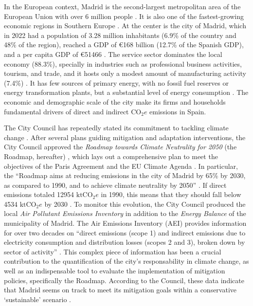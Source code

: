 \documentclass[
  10pt,
  twocolumn]{aft}
\begin{document}
In the European context, Madrid is the second-largest metropolitan area
of the European Union with over 6 million people
\citep{eurostat_population_2024}. It is also one of the fastest-growing
economic regions in Southern Europe \citep{eurostat_gross_2024}. At the
center is the city of Madrid, which in 2022 had a population of 3.28
million inhabitants (6.9\% of the country and 48\% of the region),
reached a GDP of \euro{}168 billion (12.7\% of the Spanish GDP), and a
per capita GDP of \euro{}51466
\citep{am_areas_2023, amMadridEconomia20232023}. The service sector
dominates the local economy (88.3\%), specially in industries such as
professional business activities, tourism, and trade, and it hosts only
a modest amount of manufacturing activity (7.4\%)
\citep{am_areas_2023, am_estructura_2013, amRoadmapClimateNeutrality2022, amMadridEconomia20232023}.
It has few sources of primary energy, with no fossil fuel reserves or
energy transformation plants, but a substantial level of energy
consumption \citep{perez_methodology_2019}. The economic and demographic
scale of the city make its firms and households fundamental drivers of
direct and indirect \(\text{CO}_2e\) emissions in Spain.

The City Council has repeatedly stated its commitment to tackling
climate change \citep{am_inventario_2021}. After several plans guiding
mitigation and adaptation interventions, the City Council approved the
\emph{Roadmap towards Climate Neutrality for 2050} (the Roadmap,
hereafter) \citep{amRoadmapClimateNeutrality2022}, which lays out a
comprehensive plan to meet the objectives of the Paris Agreement and the
EU Climate Agenda \citep{JRC130230}. In particular, the ``Roadmap aims
at reducing emissions in the city of Madrid by 65\% by 2030, as compared
to 1990, and to achieve climate neutrality by 2050''
\citep[p.3]{amRoadmapClimateNeutrality2022}. If direct emissions totaled
12954 \(\text{ktCO}_2e\) in 1990, this means that they should fall below
4534 \(\text{ktCO}_2e\) by 2030
\citep[12]{amRoadmapClimateNeutrality2022}. To monitor this evolution,
the City Council produced the local \emph{Air Pollutant Emissions
Inventory} in addition to the \emph{Energy Balance} of the municipality
of Madrid. The Air Emissions Inventory (AEI) provides information for
over two decades on ``direct emissions (scope 1) and indirect emissions
due to electricity consumption and distribution losses (scopes 2 and 3),
broken down by sector of activity''
\citep[p.6]{amRoadmapClimateNeutrality2022}. This complex piece of
information has been a crucial contribution to the quantification of the
city's responsability in climate change, as well as an indispensable
tool to evaluate the implementation of mitigation policies, specifically
the Roadmap. According to the Council, these data indicate that Madrid
seems on track to meet its mitigation goals within a conservative
`sustainable' scenario
\citep{JRC130230, amRoadmapClimateNeutrality2022}.
\end{document}
